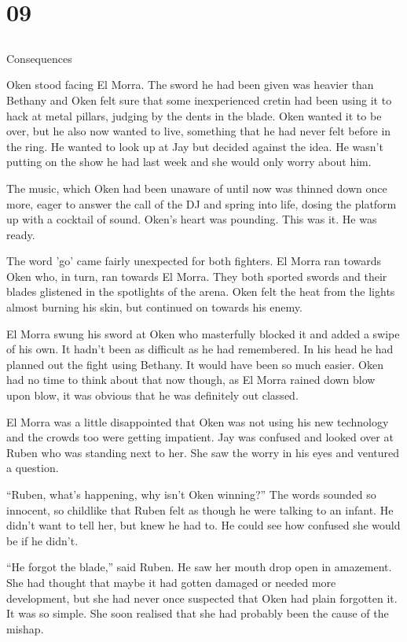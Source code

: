 \chapter{09}
\section{}
Consequences  

Oken stood facing El Morra.  The sword he had been given was heavier than Bethany and Oken felt sure that some inexperienced cretin had been using it to hack at metal pillars, judging by the dents in the blade.  Oken wanted it to be over, but he also now wanted to live, something that he had never felt before in the ring.  He wanted to look up at Jay but decided against the idea.  He wasn't putting on the show he had last week and she would only worry about him.

The music, which Oken had been unaware of until now was thinned down once more, eager to answer the call of the DJ and spring into life, dosing the platform up with a cocktail of sound.  Oken's heart was pounding.  This was it.  He was ready.

The word 'go' came fairly unexpected for both fighters.  El Morra ran towards Oken who, in turn, ran towards El Morra.  They both sported swords and their blades glistened in the spotlights of the arena.  Oken felt the heat from the lights almost burning his skin, but continued on towards his enemy.  

El Morra swung his sword at Oken who masterfully blocked it and added a swipe of his own.  It hadn't been as difficult as he had remembered.  In his head he had planned out the fight using Bethany.  It would have been so much easier.  Oken had no time to think about that now though, as El Morra rained down blow upon blow, it was obvious that he was definitely out classed.

El Morra was a little disappointed that Oken was not using his new technology and the crowds too were getting impatient.  Jay was confused and looked over at Ruben who was standing next to her.  She saw the worry in his eyes and ventured a question.

``Ruben, what's happening, why isn't Oken winning?''  The words sounded so innocent, so childlike that Ruben felt as though he were talking to an infant.  He didn't want to tell her, but knew he had to.  He could see how confused she would be if he didn't.

``He forgot the blade,'' said Ruben.  He saw her mouth drop open in amazement.  She had thought that maybe it had gotten damaged or needed more development, but she had never once suspected that Oken had plain forgotten it.  It was so simple.  She soon realised that she had probably been the cause of the mishap.  

